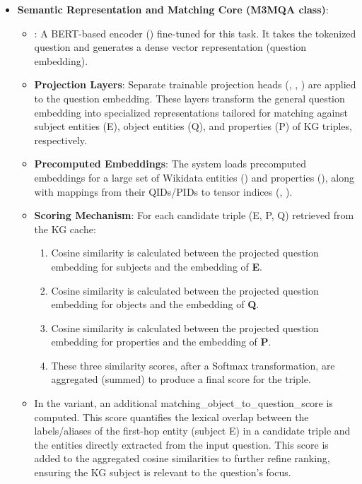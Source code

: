 \begin{itemize}
\begin{itemize}
    \end{itemize}
    \item \textbf{Semantic Representation and Matching Core (M3MQA class)}:
    \begin{itemize}
        \item {}: A BERT-based encoder () fine-tuned for this task. It takes the tokenized question and generates a dense vector representation (question embedding).
        \item \textbf{Projection Layers}: Separate trainable projection heads (, , ) are applied to the question embedding. These layers transform the general question embedding into specialized representations tailored for matching against subject entities (E), object entities (Q), and properties (P) of KG triples, respectively.
        \item \textbf{Precomputed Embeddings}: The system loads precomputed embeddings for a large set of Wikidata entities () and properties (), along with mappings from their QIDs/PIDs to tensor indices (, ).
        \item \textbf{Scoring Mechanism}: For each candidate triple (E, P, Q) retrieved from the KG cache:
        \begin{enumerate}
            \item Cosine similarity is calculated between the projected question embedding for subjects and the embedding of \textbf{E}.
            \item Cosine similarity is calculated between the projected question embedding for objects and the embedding of \textbf{Q}.
            \item Cosine similarity is calculated between the projected question embedding for properties and the embedding of \textbf{P}.
            \item These three similarity scores, after a Softmax transformation, are aggregated (summed) to produce a final score for the triple.
        \end{enumerate}
        \item In the  variant, an additional matching\_object\_to\_question\_score is computed. This score quantifies the lexical overlap between the labels/aliases of the first-hop entity (subject E) in a candidate triple and the entities directly extracted from the input question. This score is added to the aggregated cosine similarities to further refine ranking, ensuring the KG subject is relevant to the question's focus.

\end{itemize}
\end{itemize}
